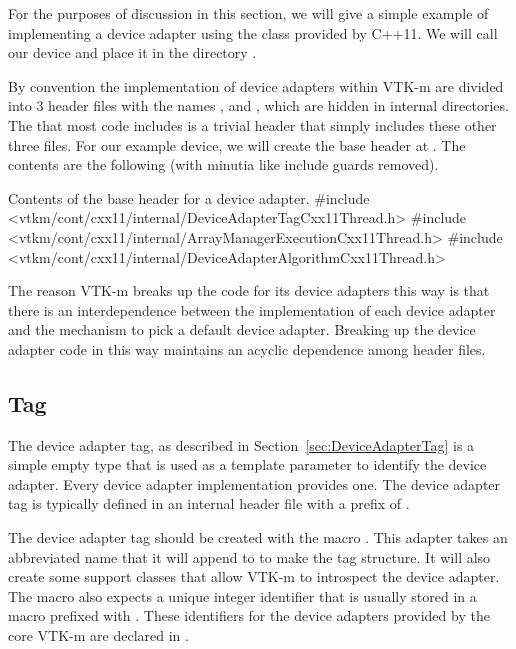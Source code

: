 For the purposes of discussion in this section, we will give a simple
example of implementing a device adapter using the 
class provided by C++11. We will call our device  and
place it in the directory .

By convention the implementation of device adapters within VTK-m are
divided into 3 header files with the names
,
 and
, which are
hidden in internal directories. The
 that most code includes
is a trivial header that simply includes these other three files. For our
example  device, we will create the base header at
. The contents are
the following (with minutia like include guards removed).

\begin{vtkmexample}{Contents of the base header for a device adapter.}
#include <vtkm/cont/cxx11/internal/DeviceAdapterTagCxx11Thread.h>
#include <vtkm/cont/cxx11/internal/ArrayManagerExecutionCxx11Thread.h>
#include <vtkm/cont/cxx11/internal/DeviceAdapterAlgorithmCxx11Thread.h>
\end{vtkmexample}

The reason VTK-m breaks up the code for its device adapters this way is
that there is an interdependence between the implementation of each device
adapter and the mechanism to pick a default device adapter. Breaking up the
device adapter code in this way maintains an acyclic dependence among
header files.

\subsection{Tag}


The device adapter tag, as described in Section~\ref{sec:DeviceAdapterTag}
is a simple empty type that is used as a template parameter to identify the
device adapter. Every device adapter implementation provides one. The
device adapter tag is typically defined in an internal header file with a
prefix of .

The device adapter tag should be created with the macro
. This adapter takes an abbreviated
name that it will append to  to make the tag
structure. It will also create some support classes that allow VTK-m to
introspect the device adapter. The macro also expects a unique integer
identifier that is usually stored in a macro prefixed with
. These identifiers for the device
adapters provided by the core VTK-m are declared in
.

